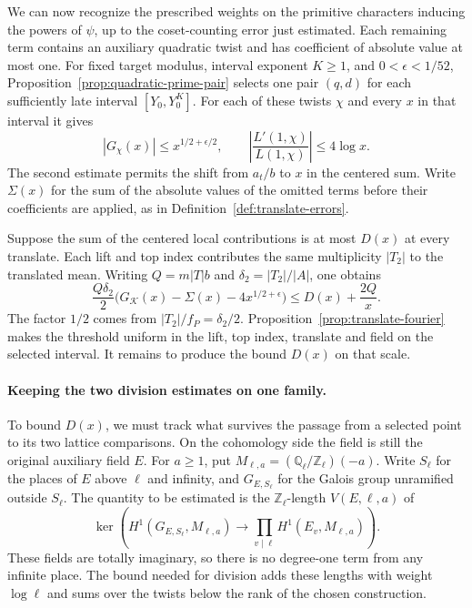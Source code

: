 We can now recognize the prescribed weights on the primitive characters inducing the powers of \(\psi\), up to the coset-counting error just estimated. Each remaining term contains an auxiliary quadratic twist and has coefficient of absolute value at most one. For fixed target modulus, interval exponent \(K\ge1\), and
\(0<\epsilon<1/52\), Proposition~\ref{prop:quadratic-prime-pair}
selects one pair \((q,d)\) for each sufficiently late interval
\([Y_0,Y_0^K]\). For each of these twists \(\chi\) and every \(x\) in
that interval it gives
\[
 |G_\chi(x)|\le x^{1/2+\epsilon/2},\qquad
 \left|\frac{L'(1,\chi)}{L(1,\chi)}\right|\le4\log x .
\] The second estimate permits
the shift from \(a_t/b\) to \(x\) in the centered sum. Write \(\Sigma(x)\)
for the sum of the absolute values of the omitted terms before their
coefficients are applied, as in Definition~\ref{def:translate-errors}.

Suppose the sum of the centered local contributions is at most
\(D(x)\) at every translate. Each lift and top index contributes the
same multiplicity \(|T_2|\) to the translated mean. Writing
\(Q=m|T|b\) and \(\delta_2=|T_2|/|A|\), one obtains
\[
 \frac{Q\delta_2}{2}
       \bigl(G_{\mathcal K}(x)-\Sigma(x)-4x^{1/2+\epsilon}\bigr)
    \le D(x)+\frac{2Q}{x}.
\]
The factor \(1/2\) comes from \(|T_2|/f_P=\delta_2/2\).
Proposition~\ref{prop:translate-fourier} makes the threshold uniform in
the lift, top index, translate and field on the selected interval.
It remains to produce the bound \(D(x)\) on that scale.

\paragraph{Keeping the two division estimates on one family.}
To bound \(D(x)\), we must track what survives the passage from a selected point to
its two lattice comparisons. On the cohomology side the field is still the original
auxiliary field \(E\).
For \(a\ge1\), put \(M_{\ell,a}=(\mathbb Q_\ell/\mathbb Z_\ell)(-a)\).
Write \(S_\ell\) for the places of \(E\) above \(\ell\) and infinity,
and \(G_{E,S_\ell}\) for the Galois group unramified outside
\(S_\ell\). The quantity to be estimated is the \(\mathbb Z_\ell\)-length
\(V(E,\ell,a)\) of
\[
 \ker\!\left(H^1(G_{E,S_\ell},M_{\ell,a})
          \longrightarrow\prod_{v\mid\ell}H^1(E_v,M_{\ell,a})\right).
\]
These fields are totally imaginary, so there is no degree-one term
from any infinite place. The bound needed for division adds these
lengths with weight \(\log\ell\) and sums over the twists below
the rank of the chosen construction.


